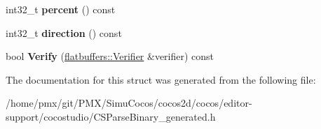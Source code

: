 \begin{DoxyCompactItemize}
int32\+\_\+t {\bfseries percent} () const
\item 
\mbox{\label{structflatbuffers_1_1LoadingBarOptions_ab55d33a4d43f20b43f3b8779a204bcd6}} 
int32\+\_\+t {\bfseries direction} () const
\item 
\mbox{\label{structflatbuffers_1_1LoadingBarOptions_af348176735d1dad561017a062784a956}} 
bool {\bfseries Verify} (\hyperlink{classflatbuffers_1_1Verifier}{flatbuffers\+::\+Verifier} \&verifier) const
\end{DoxyCompactItemize}


The documentation for this struct was generated from the following file\+:\begin{DoxyCompactItemize}
\item 
/home/pmx/git/\+P\+M\+X/\+Simu\+Cocos/cocos2d/cocos/editor-\/support/cocostudio/C\+S\+Parse\+Binary\+\_\+generated.\+h\end{DoxyCompactItemize}
